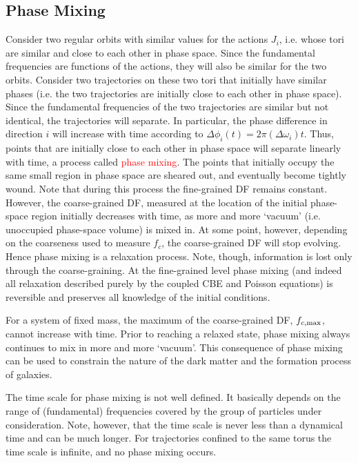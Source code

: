\documentclass[12pt,a4paper]{article}
\begin{document}
\subsection{Phase Mixing}
\cite{2010gfe..book.....M} Consider two regular orbits with similar values for the actions $J_i$, i.e. whose tori are similar and close to each other in phase space. Since the fundamental frequencies are functions of the actions, they will also be similar for the two orbits. Consider two trajectories on these two tori that initially have similar phases (i.e. the two trajectories are initially close to each other in phase space). Since the fundamental frequencies of the two trajectories are similar but not identical, the trajectories will separate. In particular, the phase difference in direction $i$ will increase with time according to $\Delta \phi_i(t) = 2\pi (\Delta \omega_i)t$. Thus, points that are initially close to each other in phase space will separate linearly with time, a process called \textcolor{red}{phase mixing}. The points that initially occupy the same small region in phase space are sheared out, and eventually become tightly wound. Note that during this process the fine-grained DF remains constant. However, the coarse-grained DF, measured at the location of the initial phase-space region initially decreases with time, as more and more `vacuum' (i.e. unoccupied phase-space volume) is mixed in. At some point, however, depending on the coarseness used to measure $f_c$, the coarse-grained DF will stop evolving. Hence phase mixing is a relaxation process. Note, though, information is lost only through the coarse-graining. At the fine-grained level phase mixing (and indeed all relaxation described purely by the coupled CBE and Poisson equations) is reversible and preserves all knowledge of the initial conditions.

For a system of fixed mass, the maximum of the coarse-grained DF, $f_{c, \rm max}$, cannot increase with time. Prior to reaching a relaxed state, phase mixing always continues to mix in more and more `vacuum'. This consequence of phase mixing can be used to constrain the nature of the dark matter and the formation process of galaxies.  

The time scale for phase mixing is not well defined. It basically depends on the range of (fundamental) frequencies covered by the group of particles under consideration. Note, however, that the time scale is never less than a dynamical time and can be much longer. For trajectories confined to the same torus the time scale is infinite, and no phase mixing occurs.
\end{document}
